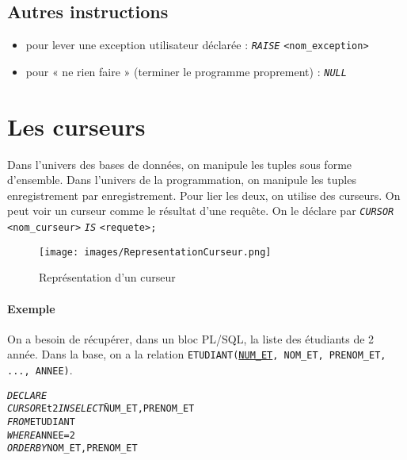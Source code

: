 \documentclass[10pt]{article}
\begin{document}
		\subsection{Autres instructions}
			\begin{itemize}
				\item pour lever une exception utilisateur déclarée : \emph{\texttt{RAISE}} \texttt{<nom\_exception>}
				\item pour « ne rien faire » (terminer le programme proprement) : \emph{\texttt{NULL}}
			\end{itemize}
			
	\section{Les curseurs}
		Dans l'univers des bases de données, on manipule les tuples sous forme d'ensemble. Dans l'univers de la programmation, on manipule les tuples enregistrement par enregistrement. Pour lier les deux, on utilise des curseurs. On peut voir un curseur comme le résultat d'une requête. On le déclare par \emph{\texttt{CURSOR}} \texttt{<nom\_curseur>} \emph{\texttt{IS}} \texttt{<requete>;}
			\begin{figure}[H]
				\begin{center}
					\texttt{[image: images/RepresentationCurseur.png]}
				\end{center}
				\caption{Représentation d'un curseur}
			\end{figure}
			
			\paragraph{Exemple} On a besoin de récupérer, dans un bloc PL/SQL, la liste des étudiants de 2 année. Dans la base, on a la relation \texttt{ETUDIANT(}\underline{\texttt{NUM\_ET}}\texttt{, NOM\_ET, PRENOM\_ET, ..., ANNEE)}.
				\begin{alltt}
					\begin{tabbing}
						\emph{DECLARE} \=\\
							\>\emph{CURSOR} Et2 \emph{IN} \=\emph{SELECT}\= NUM_ET, PRENOM_ET\\
												\>\>\emph{FROM} ETUDIANT\\
												\>\>\emph{WHERE} ANNEE=2\\
												\>\>\emph{ORDER BY} NOM_ET, PRENOM_ET
					\end{tabbing}
				\end{alltt}
\end{document}
